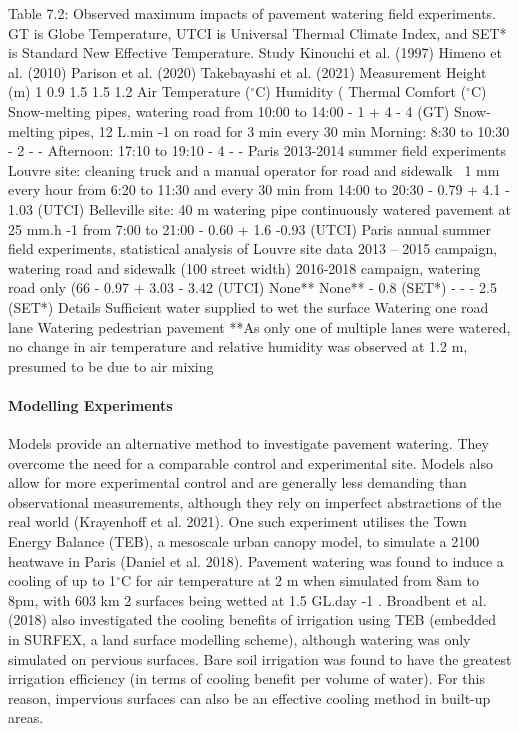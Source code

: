 \documentclass[final,3p,times,authoryear]{elsarticle}
\begin{document}
Table 7.2: Observed maximum impacts of pavement watering field experiments. GT is Globe Temperature, UTCI is Universal Thermal Climate Index, and SET* is Standard
New Effective Temperature.
Study
Kinouchi et al.
(1997)
Himeno et al.
(2010)
\cite{Hendel2016}
Parison et al.
(2020)
Takebayashi et
al. (2021)
Measurement
Height (m)
1
0.9
1.5
1.5
1.2
Air
Temperature
($^{\circ}$C) Humidity
(%
Thermal Comfort
($^{\circ}$C)
Snow-melting pipes, watering road from 10:00 to 14:00 - 1 + 4 - 4 (GT)
Snow-melting pipes, 12 L.min -1 on road for 3 min every 30 min
Morning: 8:30 to 10:30 - 2 - -
Afternoon: 17:10 to 19:10 - 4 - -
Paris 2013-2014 summer field experiments
Louvre site: cleaning truck and a manual operator for road and
sidewalk ~1 mm every hour from 6:20 to 11:30 and every 30
min from 14:00 to 20:30 - 0.79 + 4.1 - 1.03 (UTCI)
Belleville site: 40 m watering pipe continuously watered
pavement at 25 mm.h -1 from 7:00 to 21:00 - 0.60 + 1.6 -0.93 (UTCI)
Paris annual summer field experiments, statistical analysis of
Louvre site data
2013 – 2015 campaign, watering road and sidewalk (100%
street width)
2016-2018 campaign, watering road only (66%
- 0.97 + 3.03 - 3.42 (UTCI)
None** None** - 0.8 (SET*)
- - - 2.5 (SET*)
Details
Sufficient water supplied to wet the surface
Watering one road lane
Watering pedestrian pavement
**As only one of multiple lanes were watered, no change in air temperature and relative humidity was observed at 1.2 m, presumed to be due to air mixing
\label{table:7.2}


\paragraph{Modelling Experiments}\label{sec:appendix7.1.4}

Models provide an alternative method to investigate pavement watering. They
overcome the need for a comparable control and experimental site. Models also allow
for more experimental control and are generally less demanding than observational measurements, although they rely on imperfect abstractions of the real world
(Krayenhoff et al. 2021).
One such experiment utilises the Town Energy Balance (TEB), a mesoscale urban
canopy model, to simulate a 2100 heatwave in Paris (Daniel et al. 2018). Pavement
watering was found to induce a cooling of up to 1$^{\circ}$C for air temperature at 2 m when
simulated from 8am to 8pm, with 603 km 2 surfaces being wetted at 1.5 GL.day -1 .
Broadbent et al. (2018) also investigated the cooling benefits of irrigation using TEB
(embedded in SURFEX, a land surface modelling scheme), although watering was only
simulated on pervious surfaces. Bare soil irrigation was found to have the greatest
irrigation efficiency (in terms of cooling benefit per volume of water). For this reason,
impervious surfaces can also be an effective cooling method in built-up areas.
\end{document}

